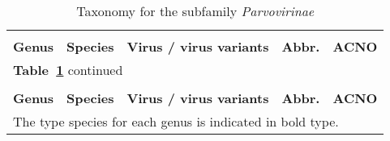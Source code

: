  








 



\clearpage



\begin{tiny}
\begin{center}

\begin{longtable}{p{0.7in} p{1.65in} p{1.6in} p{0.6in} p{0.65in}}
\caption[Taxonomy for the subfamily \textit{Parvovirinae}]{\normalsize Taxonomy for the subfamily \textit{Parvovirinae}}\\
\\
\label{Tab: Taxonomy}
\normalsize\textbf{Genus} & \normalsize\textbf{Species} & \normalsize\textbf{Virus / virus variants} & \normalsize\textbf{Abbr.} & \normalsize\textbf{ACNO}\footnotemark\\
\hline
\endfirsthead %

\multicolumn{3}{l}{\normalsize\textbf{Table~\ref{Tab: Taxonomy}} continued}\\
\\
\normalsize\textbf{Genus} & \normalsize\textbf{Species} & \normalsize\textbf{Virus / virus variants} & \normalsize\textbf{Abbr.} & \normalsize\textbf{ACNO}\\
\hline
\endhead

\hline
\multicolumn{5}{l}{\normalsize The type species for each genus is indicated in bold type. \cite{pmid24212889}}
\endlastfoot


\end{longtable}
\end{center}
\end{tiny}
